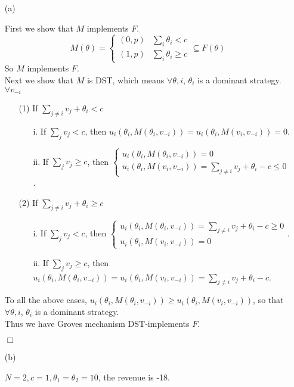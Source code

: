 \documentclass[12pt]{article}
\newenvironment{proof}{\noindent{\em Proof.} \hspace*{1mm}}{
\hspace*{\fill} $\Box$ }
\begin{document}
\begin{enumerate}

\item[(a)]

\begin{proof}
First we show that $M$ implements $F$.
$$
M(\theta)=\left\{\begin{array}{ll}
(0,p) & \sum_i\theta_i<c\\ 
(1,p) & \sum_i\theta_i\geq c
	\end{array}\right .\subseteq F(\theta)
$$
So  $M$ implements $F$. 
\\
Next we show that $M$ is DST, which means $\forall\theta,i$, $\theta_i$ is a dominant strategy. 
$\forall v_{-i}$
\begin{enumerate}
\item[(1)] If $\displaystyle\sum_{j\neq i}v_j+\theta_i <c$

\begin{enumerate}
\item[i.]
If $\displaystyle\sum_{j}v_j<c$, then $u_i(\theta_i,M(\theta_i,v_{-i}))=u_i(\theta_i,M(v_i,v_{-i}))=0$.
\item[ii.]
If $\displaystyle\sum_{j}v_j\geq c$, then 
$\left\{\begin{array}{l}
		u_i(\theta_i,M(\theta_i,v_{-i}))=0\\
		u_i(\theta_i,M(v_i,v_{-i}))=\sum_{j\neq i}v_j+\theta_i-c\leq 0
\end{array}\right .
$.
\end{enumerate}

\item[(2)] If $\displaystyle\sum_{j\neq i}v_j+\theta_i\geq c$
\begin{enumerate}
\item[i.]
If $\displaystyle\sum_{j}v_j<c$, then
$\left\{\begin{array}{l}
		u_i(\theta_i,M(\theta_i,v_{-i}))=\sum_{j\neq i}v_j+\theta_i-c\geq 0\\
		u_i(\theta_i,M(v_i,v_{-i}))=0
\end{array}\right .
$.
\item[ii.]
If $\displaystyle\sum_{j}v_j\geq c$, then
$u_i(\theta_i,M(\theta_i,v_{-i}))=u_i(\theta_i,M(v_i,v_{-i}))=\sum_{j\neq i}v_j+\theta_i-c$.
\end{enumerate}

\end{enumerate}

To all the above cases, 
$u_i(\theta_i,M(\theta_i,v_{-i}))\geq u_i(\theta_i,M(v_i,v_{-i}))$,
so that  $\forall\theta,i$, $\theta_i$ is a dominant strategy.
\\
Thus we have Groves mechanism DST-implements $F$.
\end{proof}

\item[(b)]

$N=2,c=1,\theta_1=\theta_2=10$, the revenue is -18. 

\end{enumerate}
\end{document}
